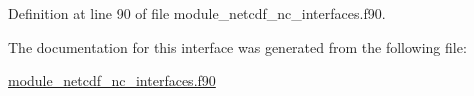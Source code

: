 Definition at line 90 of file module\+\_\+netcdf\+\_\+nc\+\_\+interfaces.\+f90.



The documentation for this interface was generated from the following file\+:\begin{DoxyCompactItemize}
\item 
\hyperlink{module__netcdf__nc__interfaces_8f90}{module\+\_\+netcdf\+\_\+nc\+\_\+interfaces.\+f90}\end{DoxyCompactItemize}
